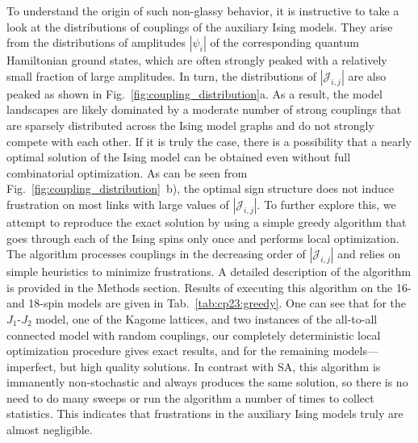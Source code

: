 To understand the origin of such non-glassy behavior, it is instructive to take a look at the distributions of couplings of the auxiliary Ising models. They arise from the distributions of amplitudes $|\psi_i|$ of the corresponding quantum Hamiltonian ground states, which are often strongly peaked with a relatively small fraction of large amplitudes. In turn, the distributions of $|\mathcal{J}_{i,j}|$ are also peaked as shown in Fig.~\ref{fig:coupling_distribution}a. As a result, the model landscapes are likely dominated by a moderate number of strong couplings that are sparsely distributed across the Ising model graphs and do not strongly compete with each other. If it is truly the case, there is a possibility that a nearly optimal solution of the Ising model can be obtained even without full combinatorial optimization. As can be seen from Fig.~\ref{fig:coupling_distribution}~b), the optimal sign structure does not induce frustration on most links with large values of $|\mathcal{J}_{i,j}|$. To further explore this, we attempt to reproduce the exact solution by using a simple greedy algorithm that goes through each of the Ising spins only once and performs local optimization. The algorithm processes couplings in the decreasing order of $|\mathcal{J}_{i,j}|$ and relies on simple heuristics to minimize frustrations. A detailed description of the algorithm is provided in the Methods section. Results of executing this algorithm on the 16- and 18-spin models are given in Tab.~\ref{tab:cp23:greedy}. One can see that for the $J_1$-$J_2$ model, one of the Kagome lattices, and two instances of the all-to-all connected model with random couplings, our completely deterministic local optimization procedure gives exact results, and for the remaining models---imperfect, but high quality solutions. In contrast with SA, this algorithm is immanently non-stochastic and always produces the same solution, so there is no need to do many sweeps or run the algorithm a number of times to collect statistics. This indicates that frustrations in the auxiliary Ising models truly are almost negligible.

